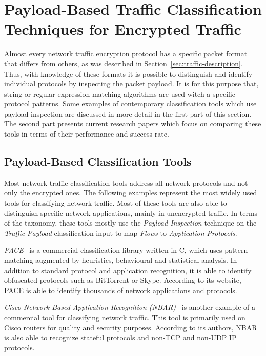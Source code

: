 \section{Payload-Based Traffic Classification Techniques for Encrypted Traffic}\label{sec:payload-classification}


Almost every network traffic encryption protocol has a specific packet format that differs from others, as was described in Section~\ref{sec:traffic-description}. Thus, with knowledge of these formats it is possible to distinguish and identify individual protocols by inspecting the packet payload. It is for this purpose that, string or regular expression matching algorithms are used witch a specific protocol patterns. Some examples of contemporary classification tools which use payload inspection are discussed in more detail in the first part of this section. The second part presents current research papers which focus on comparing these tools in terms of their performance and success rate.


\subsection{Payload-Based Classification Tools}

Most network traffic classification tools address all network protocols and not only the encrypted ones. The following examples represent the most widely used tools for classifying network traffic. Most of these tools are also able to distinguish specific network applications, mainly in unencrypted traffic. In terms of the taxonomy, these tools mostly use the \textit{Payload Inspection} technique on the \textit{Traffic Payload} classification input to map \textit{Flows} to \textit{Application Protocols}.

\textit{PACE}~\cite{pace} is a commercial classification library written in C, which uses pattern matching augmented by heuristics, behavioural and statistical analysis. In addition to standard protocol and application recognition, it is able to identify obfuscated protocols such as BitTorrent or Skype. According to its website, PACE is able to identify thousands of network applications and protocols.

\textit{Cisco Network Based Application Recognition (NBAR)}~\cite{nbar} is another example of a commercial tool for classifying network traffic. This tool is primarily used on Cisco routers for quality and security purposes. According to its authors, NBAR is also able to recognize stateful protocols and non-TCP and non-UDP IP protocols.

